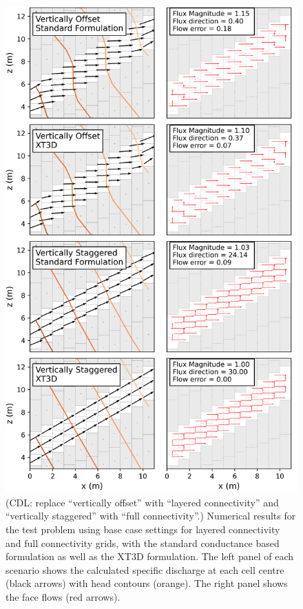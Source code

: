 \documentclass{article}
\begin{document}
\begin{figure}[p!]
	\begin{center}
	\includegraphics[scale=0.8]{../figures/fig2_paper.png}
	\caption{{\color{red} (CDL: replace ``vertically offset'' with ``layered connectivity'' and ``vertically staggered'' with ``full connectivity''.)} Numerical results for the test problem using base case settings for layered connectivity and full connectivity grids, with the standard conductance based formulation as well as the XT3D formulation. The left panel of each scenario shows the calculated specific discharge at each cell centre (black arrows) with head contours (orange). The right panel shows the face flows (red arrows).}
	\label{fig:fig2}
	\end{center}
\end{figure}
\end{document}
